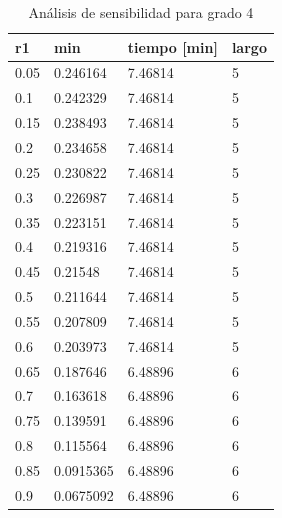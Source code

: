 \documentclass[letter, 10pt]{article}
\begin{document}
\begin{table}[H]
\centering
\begin{tabular}{|l|l|l|l|}
\hline
r1 & min & tiempo {[}min{]} & largo \\ \hline
0.05 & 0.246164 & 7.46814 & 5 \\ \hline
0.1 & 0.242329 & 7.46814 & 5 \\ \hline
0.15 & 0.238493 & 7.46814 & 5 \\ \hline
0.2 & 0.234658 & 7.46814 & 5 \\ \hline
0.25 & 0.230822 & 7.46814 & 5 \\ \hline
0.3 & 0.226987 & 7.46814 & 5 \\ \hline
0.35 & 0.223151 & 7.46814 & 5 \\ \hline
0.4 & 0.219316 & 7.46814 & 5 \\ \hline
0.45 & 0.21548 & 7.46814 & 5 \\ \hline
0.5 & 0.211644 & 7.46814 & 5 \\ \hline
0.55 & 0.207809 & 7.46814 & 5 \\ \hline
0.6 & 0.203973 & 7.46814 & 5 \\ \hline
0.65 & 0.187646 & 6.48896 & 6 \\ \hline
0.7 & 0.163618 & 6.48896 & 6 \\ \hline
0.75 & 0.139591 & 6.48896 & 6 \\ \hline
0.8 & 0.115564 & 6.48896 & 6 \\ \hline
0.85 & 0.0915365 & 6.48896 & 6 \\ \hline
0.9 & 0.0675092 & 6.48896 & 6 \\ \hline
\end{tabular}
\caption{Análisis de sensibilidad para grado 4}
\label{ses-4}
\end{table}
\end{document}
